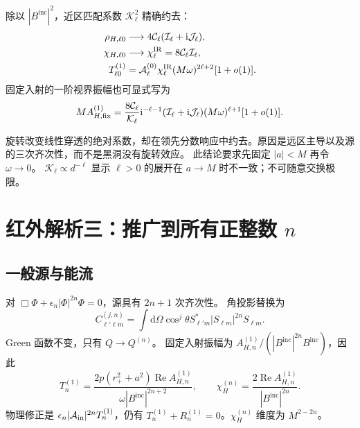 \documentclass[UTF8,fontset=fandol,11pt,a4paper]{ctexart}
\newcommand{\ii}{\mathrm{i}}
\newcommand{\dd}{\mathrm{d}}
\newcommand{\Rea}{\operatorname{Re}}
\newcommand{\Bin}{B^{\mathrm{inc}}}
\numberwithin{equation}{section}
\begin{document}
除以 $|\Bin|^2$，近区匹配系数 $\mathcal K_\ell^2$ 精确约去：
\begin{align}
\rho_{H,\ell0}&\longrightarrow4\mathcal C_\ell(\mathcal I_\ell+\ii\mathcal J_\ell),\\
\chi_{H,\ell0}&\longrightarrow\chi_\ell^{\rm IR}=8\mathcal C_\ell\mathcal I_\ell,\\
T^{(1)}_{\ell0}&=\mathcal A_\ell^{(0)}\chi_\ell^{\rm IR}(M\omega)^{2\ell+2}[1+o(1)].
\end{align}
固定入射的一阶视界振幅也可显式写为
\begin{equation}
M A_{H,\rm fix}^{(1)}=\frac{8\mathcal C_\ell}{\mathcal K_\ell}\ii^{-\ell-1}
(\mathcal I_\ell+\ii\mathcal J_\ell)(M\omega)^{\ell+1}[1+o(1)].
\end{equation}
\begin{remarkbox}
旋转改变线性穿透的绝对系数，却在领先分数响应中约去。原因是远区主导以及源的三次齐次性，而不是黑洞没有旋转效应。
此结论要求先固定 $|a|<M$ 再令 $\omega\to0$。
$\mathcal K_\ell\propto d^{-\ell}$ 显示 $\ell>0$ 的展开在 $a\to M$ 时不一致；不可随意交换极限。
\end{remarkbox}

\section{红外解析三：推广到所有正整数 \texorpdfstring{$n$}{n}}
\subsection{一般源与能流}
对 $\Box\Phi+\epsilon_n|\Phi|^{2n}\Phi=0$，源具有 $2n+1$ 次齐次性。
角投影替换为
\begin{equation}
C^{(j,n)}_{\ell'\ell m}=\int\dd\Omega\cos^j\theta S_{\ell'm}^*|S_{\ell m}|^{2n}S_{\ell m}.
\end{equation}
Green 函数不变，只有 $Q\to Q^{(n)}$。
固定入射振幅为 $A_{H,n}^{(1)}/(|\Bin|^{2n}\Bin)$，因此
\begin{equation}
T_n^{(1)}=\frac{2p(r_+^2+a^2)\Rea A_{H,n}^{(1)}}{\omega|\Bin|^{2n+2}},\qquad
\chi_H^{(n)}=\frac{2\Rea A_{H,n}^{(1)}}{|\Bin|^{2n}}.
\end{equation}
物理修正是 $\epsilon_n|\mathcal A_{\rm in}|^{2n}T_n^{(1)}$，仍有
$T_n^{(1)}+R_n^{(1)}=0$。$\chi_H^{(n)}$ 维度为 $M^{2-2n}$。
\end{document}
